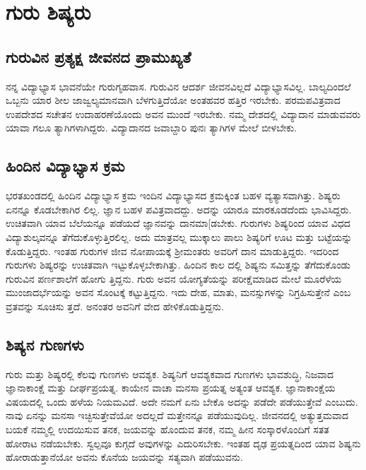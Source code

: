 
\chapter{ಗುರು ಶಿಷ್ಯರು}

\section{ಗುರುವಿನ ಪ್ರತ್ಯಕ್ಷ ಜೀವನದ ಪ್ರಾಮುಖ್ಯತೆ}

ನನ್ನ ವಿದ್ಯಾಭ್ಯಾಸ ಭಾವನೆಯೇ ಗುರುಗೃಹವಾಸ. ಗುರುವಿನ ಆದರ್ಶ ಜೀವನವಿಲ್ಲದೆ ವಿದ್ಯಾಭ್ಯಾಸವಿಲ್ಲ. ಬಾಲ್ಯದಿಂದಲೆ ಒಬ್ಬನು ಯಾರ ಶೀಲ ಜಾಜ್ವಲ್ಯಮಾನವಾಗಿ ಬೆಳಗುತ್ತಿದೆಯೋ ಅಂತಹವರ ಹತ್ತಿರ ಇರಬೇಕು. ಪರಮಪವಿತ್ರವಾದ ಉಪದೇಶದ ಸಚೇತನ ಉದಾಹರಣೆಯೊಂದು ಅವನ ಮುಂದೆ ಇರಬೇಕು. ನಮ್ಮ ದೇಶದಲ್ಲಿ ವಿದ್ಯಾದಾನ ಮಾಡುವವರು ಯಾವಾ ಗಲೂ ತ್ಯಾಗಿಗಳಾಗಿದ್ದರು. ವಿದ್ಯಾದಾನದ ಜವಾಬ್ದಾರಿ ಪುನಃ ತ್ಯಾಗಿಗಳ ಮೇಲೆ ಬೀಳಬೇಕು.


\section{ಹಿಂದಿನ ವಿದ್ಯಾಭ್ಯಾಸ ಕ್ರಮ}

ಭರತಖಂಡದಲ್ಲಿ ಹಿಂದಿನ ವಿದ್ಯಾಭ್ಯಾಸ ಕ್ರಮ ಇಂದಿನ ವಿದ್ಯಾಭ್ಯಾಸದ ಕ್ರಮಕ್ಕಿಂತ ಬಹಳ ವ್ಯತ್ಯಾಸವಾಗಿತ್ತು. ಶಿಷ್ಯರು ಏನನ್ನೂ ಕೊಡಬೇಕಾಗಿರ ಲಿಲ್ಲ. ಜ್ಞಾನ ಬಹಳ ಪವಿತ್ರವಾದದ್ದು. ಅದನ್ನು ಯಾರೂ ಮಾರಕೂಡದೆಂದು ಭಾವಿಸಿದ್ದರು. ಉಚಿತವಾಗಿ ಯಾವ ಬೆಲೆಯನ್ನೂ ಪಡೆಯದೆ ಜ್ಞಾನವನ್ನು ದಾನಮಾ[ಡಬೇಕು. ಗುರುಗಳು ಶಿಷ್ಯರಿಂದ ಯಾವ ವಿಧದ ವಿದ್ಯಾಶುಲ್ಕವನ್ನೂ ತೆಗೆದುಕೊಳ್ಳುತ್ತಿರಲಿಲ್ಲ. ಅದು ಮಾತ್ರವಲ್ಲ ಮುಕ್ಕಾಲು ಪಾಲು ಶಿಷ್ಯರಿಗೆ ಊಟ ಮತ್ತು ಬಟ್ಟೆಯನ್ನು ಕೊಡುತ್ತಿದ್ದರು. ಇಂತಹ ಗುರುಗಳ ಜೀವ ನೋಪಾಯಕ್ಕೆ ಶ್ರೀಮಂತರು ಅವರಿಗೆ ದಾನ ಮಾಡುತ್ತಿದ್ದರು. ಇದರಿಂದ ಗುರುಗಳು ಶಿಷ್ಯರನ್ನು ಉಚಿತವಾಗಿ ಇಟ್ಟುಕೊಳ್ಳಬೇಕಾಗಿತ್ತು. ಹಿಂದಿನ ಕಾಲ ದಲ್ಲಿ ಶಿಷ್ಯನು ಸಮಿತ್ತನ್ನು ತೆಗೆದುಕೊಂಡು ಗುರುವಿನ ಪರ್ಣಶಾಲೆಗೆ ಹೋಗು ತ್ತಿದ್ದನು. ಗುರು ಅವನ ಯೋಗ್ಯತೆಯನ್ನು ಪರೀಕ್ಷೆಮಾಡಿದ ಮೇಲೆ ಮೂರೆಳೆಯ ಮುಂಜಾದರ್ಭೆಯನ್ನು ಅವನ ಸೊಂಟಕ್ಕೆ ಕಟ್ಟುತ್ತಿದ್ದನು. ಇದು ದೇಹ, ಮಾತು, ಮನಸ್ಸುಗಳನ್ನು ನಿಗ್ರಹಿಸುತ್ತೇನೆ ಎಂಬ ವ್ರತವನ್ನು ಸೂಚಿಸು ತ್ತದೆ. ಅನಂತರ ಅವನಿಗೆ ವೇದ ಹೇಳಿಕೊಡುತ್ತಿದ್ದನು.


\section{ಶಿಷ್ಯನ ಗುಣಗಳು}

ಗುರು ಮತ್ತು ಶಿಷ್ಯರಲ್ಲಿ ಕೆಲವು ಗುಣಗಳು ಆವಶ್ಯಕ. ಶಿಷ್ಯನಿಗೆ ಆವಶ್ಯಕವಾದ ಗುಣಗಳು ಭಾವಶುದ್ಧಿ, ನಿಜವಾದ ಜ್ಞಾನಾಕಾಂಕ್ಷೆ ಮತ್ತು ದೀರ್ಘಪ್ರಯತ್ನ. ಕಾಯೇನ ವಾಚಾ ಮನಸಾ ಪ್ರಯತ್ನ ಅತ್ಯಂತ ಆವಶ್ಯಕ. ಜ್ಞಾನಾಕಾಂಕ್ಷೆಯ ವಿಷಯದಲ್ಲಿ ಒಂದು ಹಳೆಯ ನಿಯಮವಿದೆ. ಅದೇ ನಮಗೆ ಏನು ಬೇಕೊ ಅದನ್ನು ಪಡೆದೇ ಪಡೆಯುತ್ತೇವೆ ಎಂಬುದು. ನಾವು ಏನನ್ನು ಮನಸಾ ಇಚ್ಛಿಸುತ್ತೇವೆಯೋ ಅದಲ್ಲದೆ ಮತ್ತೇನನ್ನೂ ಪಡೆಯುವುದಿಲ್ಲ. ಜೀವನದಲ್ಲಿ ಅತ್ಯುತ್ತಮವಾದ ಬಯಕೆ ನಮ್ಮಲ್ಲಿ ಉದಯಿಸುವ ತನಕ, ಜಯವನ್ನು ಹೊಂದುವ ತನಕ, ನಮ್ಮ ಹೀನ ಸಂಸ್ಕಾರಳೊಂದಿಗೆ ಸತತ ಹೋರಾಟ ನಡೆಯಬೇಕು. ಸ್ವಲ್ಪವೂ ಕುಗ್ಗದೆ ಅವುಗಳನ್ನು ಎದುರಿಸಬೇಕು. ಇಂತಹ ದೃಢ ಪ್ರಯತ್ನದಿಂದ ಯಾವ ಶಿಷ್ಯನು ಹೋರಾಡುತ್ತಾನೆಯೋ ಅವನು ಕೊನೆಯ ಜಯವನ್ನು ಸತ್ಯವಾಗಿ ಪಡೆಯುವನು.


